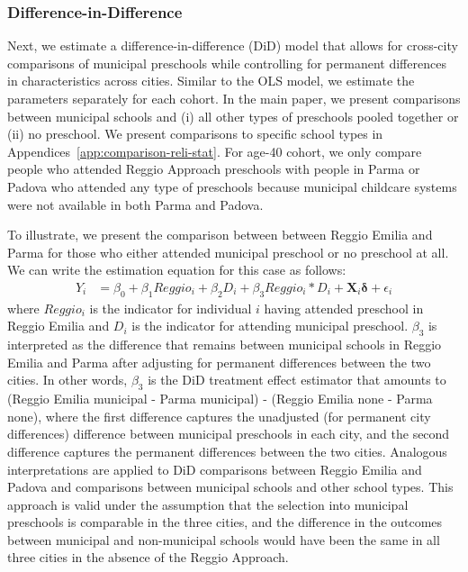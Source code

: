 \subsubsection{Difference-in-Difference}  \label{subsubsection:DID}
Next, we estimate a difference-in-difference (DiD) model that allows for cross-city comparisons of municipal preschools while controlling for permanent differences in characteristics across cities. Similar to the OLS model, we estimate the parameters separately for each cohort. In the main paper, we present comparisons between municipal schools and (i) all other types of preschools pooled together or (ii) no preschool. We present comparisons to specific school types in Appendices~\ref{app:comparison-reli-stat}. %
For age-40 cohort, we only compare people who attended Reggio Approach preschools with people in Parma or Padova who attended any type of preschools because municipal childcare systems were not available in both Parma and Padova.

To illustrate, we present the comparison between between Reggio Emilia and Parma for those who either attended municipal preschool or no preschool at all. We can write the estimation equation for this case as follows:
\begin{eqnarray}  \label{eq:specific2}
Y_i & = \beta_0 + \beta_1 Reggio_i + \beta_2 D_i + \beta_3 Reggio_i * D_i + \bm{X}_i \bm{\delta} + \epsilon_i
\end{eqnarray}
\noindent where $Reggio_i$ is the indicator for individual $i$ having attended preschool in Reggio Emilia and $D_i$ is the indicator for attending municipal preschool. $\beta_3$ is interpreted as the difference that remains between municipal schools in Reggio Emilia and Parma after adjusting for permanent differences between the two cities. In other words, $\beta_3$ is the DiD treatment effect estimator that amounts to (Reggio Emilia municipal - Parma municipal) - (Reggio Emilia none - Parma none), where the first difference captures the unadjusted (for permanent city differences) difference between municipal preschools in each city, and the second difference captures the permanent differences between the two cities. Analogous interpretations are applied to DiD comparisons between Reggio Emilia and Padova and comparisons between municipal schools and other school types. This approach is valid under the assumption that the selection into municipal preschools is comparable in the three cities, and the difference in the outcomes between municipal and non-municipal schools would have been the same in all three cities in the absence of the Reggio Approach.

